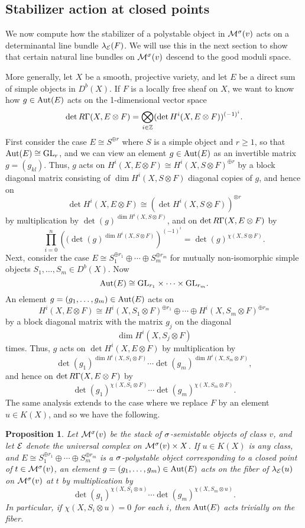\documentclass[letterpaper,12pt]{amsart}
\newtheorem{prop}[thm]{Proposition}
\theoremstyle{remark}
\begin{document}
\subsection{Stabilizer action at closed points}
We now compute how the stabilizer of a polystable object in $\mathcal{M}^\sigma(v)$ acts on a determinantal line bundle $\lambda_{\mathcal{E}}(F)$. We will use this in the next section to show that certain natural line bundles on $\mathcal{M}^\sigma(v)$ descend to the good moduli space.

More generally, let $X$ be a smooth, projective variety, and let $E$ be a direct sum of simple objects in $D^b(X)$. If $F$ is a locally free sheaf on $X$, we want to know how $g \in \mathrm{Aut}(E)$ acts on the 1-dimensional vector space
\[ \det R \Gamma(X, E \otimes F) = \bigotimes_{i \in \mathbb{Z}} (\det H^i(X, E \otimes F))^{(-1)^i}. \]
First consider the case $E \cong S^{\oplus r}$ where $S$ is a simple object and $r \ge 1$, so that $\mathrm{Aut}(E) \cong \mathrm{GL}_r$, and we can view an element $g \in \mathrm{Aut}(E)$ as an invertible matrix $g = (g_{kl})$. Thus, $g$ acts on $H^i(X, E \otimes F) \cong H^i(X, S \otimes F)^{\oplus r}$ by a block diagonal matrix consisting of $\dim H^i(X, S \otimes F)$ diagonal copies of $g$, and hence on
\[ \det H^i(X, E \otimes F) \cong (\det H^i(X, S \otimes F))^{\otimes r} \]
by multiplication by $\det(g)^{\dim H^i(X, S \otimes F)}$, and on $\det R \Gamma(X, E \otimes F)$ by
\[ \prod_{i=0}^n \left((\det(g)^{\dim H^i(X, S \otimes F)}\right)^{(-1)^i} = \det(g)^{\chi(X, S \otimes F)}. \]
Next, consider the case $E \cong S_1^{\oplus r_1} \oplus \cdots \oplus S_m^{\oplus r_m}$ for mutually non-isomorphic simple objects $S_1, \ldots, S_m \in D^b(X)$. Now
\[ \mathrm{Aut}(E) \cong \mathrm{GL}_{r_1} \times \cdots \times \mathrm{GL}_{r_m}. \]
An element $g = (g_1, \ldots, g_m) \in \mathrm{Aut}(E)$ acts on
\[ H^i(X, E \otimes F) \cong H^i(X, S_1 \otimes F)^{\oplus r_1} \oplus \cdots \oplus H^i(X, S_m \otimes F)^{\oplus r_m} \]
by a block diagonal matrix with the matrix $g_j$ on the diagonal 
\[ \dim H^i(X, S_j \otimes F) \]
times. Thus, $g$ acts on $\det H^i(X, E \otimes F)$ by multiplication by
\[ \det(g_1)^{\dim H^i(X, S_1 \otimes F)} \cdots \det(g_m)^{\dim H^i(X, S_m \otimes F)}, \]
and hence on $\det R \Gamma(X, E \otimes F)$ by
\[ \det(g_1)^{\chi(X, S_1 \otimes F)} \cdots \det(g_m)^{\chi(X, S_m \otimes F)}. \]
The same analysis extends to the case where we replace $F$ by an element $u \in K(X)$, and so we have the following.
\begin{prop}\label{lbtogms}
    Let $\mathcal{M}^\sigma(v)$ be the stack of $\sigma$-semistable objects of class $v$, and let $\mathcal{E}$ denote the universal complex on $\mathcal{M}^\sigma(v) \times X$. If $u \in K(X)$ is any class, and $E \cong S_1^{\oplus r_1} \oplus \cdots \oplus S_m^{\oplus r_m}$ is a $\sigma$-polystable object corresponding to a closed point of $t \in \mathcal{M}^\sigma(v)$, an element $g = (g_1,\ldots,g_m) \in \mathrm{Aut}(E)$ acts on the fiber of $\lambda_{\mathcal{E}}(u)$ on $\mathcal{M}^\sigma(v)$ at $t$ by multiplication by
    \[ \det(g_1)^{\chi(X, S_1 \otimes u)} \cdots \det(g_m)^{\chi(X, S_m \otimes u)}. \]
    In particular, if $\chi(X, S_i \otimes u) = 0$ for each $i$, then $\mathrm{Aut}(E)$ acts trivially on the fiber.
\end{prop}
\end{document}
